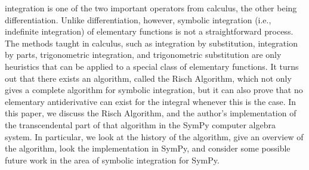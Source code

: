 \Gls{integration} is one of the two important operators from calculus,
the other being \gls{differentiation}.  Unlike \gls{differentiation},
however, symbolic \gls{integration} (i.e., indefinite \gls{integration})
of \gls{elementary} functions is not a straightforward process. The
methods taught in calculus, such as \gls{integration} by substitution,
\gls{integration} by parts, trigonometric \gls{integration}, and
trigonometric substitution are only heuristics that can be applied to a
special class of \gls{elementary} functions. It turns out that there
exists an algorithm, called the Risch Algorithm, which not only gives a
complete algorithm for symbolic \gls{integration}, but it can also prove
that no \gls{elementary} antiderivative can exist for the integral
whenever this is the case. In this paper, we discuss the Risch
Algorithm, and the author's implementation of the \gls{transcendental}
part of that algorithm in the SymPy computer algebra system.  In
particular, we look at the history of the algorithm, give an overview of
the algorithm, look the implementation in SymPy, and consider some
possible future work in the area of symbolic \gls{integration} for
SymPy.
